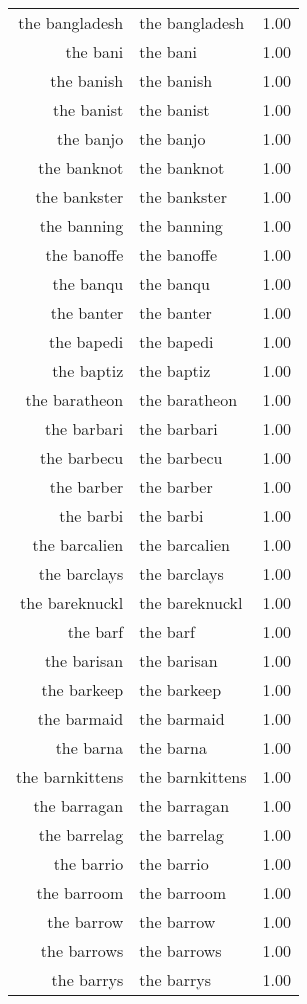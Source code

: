 \begin{table}[ht]
\begin{tabular}{rlr}
  the bangladesh & the bangladesh & 1.00 \\ 
  the bani & the bani & 1.00 \\ 
  the banish & the banish & 1.00 \\ 
  the banist & the banist & 1.00 \\ 
  the banjo & the banjo & 1.00 \\ 
  the banknot & the banknot & 1.00 \\ 
  the bankster & the bankster & 1.00 \\ 
  the banning & the banning & 1.00 \\ 
  the banoffe & the banoffe & 1.00 \\ 
  the banqu & the banqu & 1.00 \\ 
  the banter & the banter & 1.00 \\ 
  the bapedi & the bapedi & 1.00 \\ 
  the baptiz & the baptiz & 1.00 \\ 
  the baratheon & the baratheon & 1.00 \\ 
  the barbari & the barbari & 1.00 \\ 
  the barbecu & the barbecu & 1.00 \\ 
  the barber & the barber & 1.00 \\ 
  the barbi & the barbi & 1.00 \\ 
  the barcalien & the barcalien & 1.00 \\ 
  the barclays & the barclays & 1.00 \\ 
  the bareknuckl & the bareknuckl & 1.00 \\ 
  the barf & the barf & 1.00 \\ 
  the barisan & the barisan & 1.00 \\ 
  the barkeep & the barkeep & 1.00 \\ 
  the barmaid & the barmaid & 1.00 \\ 
  the barna & the barna & 1.00 \\ 
  the barnkittens & the barnkittens & 1.00 \\ 
  the barragan & the barragan & 1.00 \\ 
  the barrelag & the barrelag & 1.00 \\ 
  the barrio & the barrio & 1.00 \\ 
  the barroom & the barroom & 1.00 \\ 
  the barrow & the barrow & 1.00 \\ 
  the barrows & the barrows & 1.00 \\ 
  the barrys & the barrys & 1.00 \\ 

\end{tabular}
\end{table}
